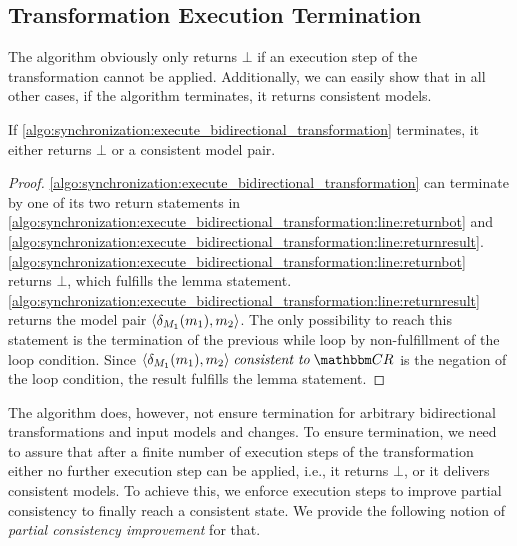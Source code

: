 \subsection{Transformation Execution Termination}

The algorithm obviously only returns $\bot$ if an execution step of the transformation cannot be applied.
Additionally, we can easily show that in all other cases, if the algorithm terminates, it returns consistent models.

\begin{lemma}
    \label{lemma:bidirectionaltransformationconsistency}
    If \autoref{algo:synchronization:execute_bidirectional_transformation} terminates, it either returns $\bot$ or a consistent model pair.
\end{lemma}
\begin{proof}
    \autoref{algo:synchronization:execute_bidirectional_transformation} can terminate by one of its two return statements in \autoref{algo:synchronization:execute_bidirectional_transformation:line:returnbot} and \autoref{algo:synchronization:execute_bidirectional_transformation:line:returnresult}.
    \autoref{algo:synchronization:execute_bidirectional_transformation:line:returnbot} returns $\bot$, which fulfills the lemma statement.
    \autoref{algo:synchronization:execute_bidirectional_transformation:line:returnresult} returns the model pair $\tupled{\change{\metamodel{M}{1}}(\model{m}{1}), \model{m}{2}}$.
    The only possibility to reach this statement is the termination of the previous while loop by non-fulfillment of the loop condition.
    Since $\tupled{\change{\metamodel{M}{1}}(\model{m}{1}), \model{m}{2}} \consistenttomath \consistencyrelationset{CR}$ is the negation of the loop condition, the result fulfills the lemma statement.
\end{proof}

The algorithm does, however, not ensure termination for arbitrary bidirectional transformations and input models and changes.
To ensure termination, we need to assure that after a finite number of execution steps of the transformation either no further execution step can be applied, i.e., it returns $\bot$, or it delivers consistent models.
To achieve this, we enforce execution steps to improve partial consistency to finally reach a consistent state. 
We provide the following notion of \emph{partial consistency improvement} for that.

